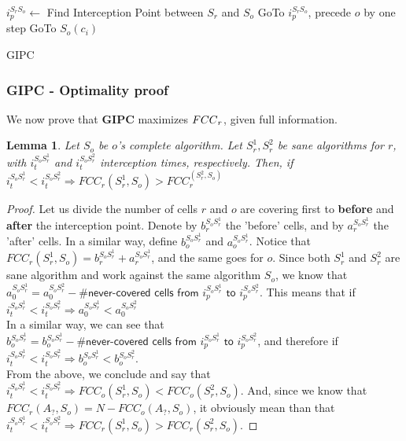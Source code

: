 \documentclass[a4paper,10pt]{article}
\newtheorem{lemma}[theorem]{Lemma}
\newcommand\rob{\ensuremath{r}\xspace}
\newcommand\opp{\ensuremath{o}\xspace}
\newcommand{\fcc}{\ensuremath{FCC}\xspace}
\begin{document}
\begin{algorithm}
\begin{algorithmic}
	\STATE $i_p^{S_{\rob} S_{\opp}} \leftarrow $ Find Interception Point between $S_{\rob}$ and $S_{\opp}$
    \STATE GoTo $i_p^{S_{\rob} S_{\opp}}$, precede \opp by one step
    \LOOP
        	\STATE GoTo $S_{\opp}(c_i)$
        \ENDIF
    \ENDLOOP
  
\end{algorithmic}
\caption{GIPC\label{lss}}
\end{algorithm}

\subsubsection{\textbf{GIPC} - Optimality proof}\label{subsection:GIPC, optimality proof}
We now prove that \textbf{GIPC} maximizes $\textnormal{\fcc}_{\rob}$, given full information. 
\begin{lemma}\label{lemmas:GIPC optimality lower i_t higher FCC}
Let $S_{\opp}$ be \opp's complete algorithm. Let $S_{\rob}^1,S_{\rob}^2$ be sane algorithms for \rob, with $i_t^{S_{\opp} S_{\rob}^1}$ and $i_t^{S_{\opp} S_{\rob}^2}$ interception times, respectively. Then, if $i_t^{S_{\opp} S_{\rob}^1} < i_t^{S_{\opp} S_{\rob}^2}\Rightarrow \fcc_{\rob}(S_{\rob}^1, S_{\opp}) > \fcc_{\rob}^(S_{\rob}^2, S_{\opp})$
\end{lemma}

\begin{proof}
Let us divide the number of cells \rob and \opp are covering first to \textbf{before} and \textbf{after} the interception point. Denote by $b_r^{S_{\opp} S_{\rob}^1}$ the 'before' cells, and by $a_r^{S_{\opp} S_{\rob}^1}$ the 'after' cells. In a similar way, define $b_{\opp}^{S_{\opp} S_{\rob}^1}$ and $a_{\opp}^{S_{\opp} S_{\rob}^1}$. Notice that $\fcc_{\rob}(S_{\rob}^1, S_{\opp})=b_r^{S_{\opp} S_{\rob}^1}+a_r^{S_{\opp} S_{\rob}^1}$, and the same goes for \opp. 
Since both $S_{\rob}^1$ and $S_{\rob}^2$ are sane algorithm and work against the same algorithm $S_{\opp}$, we know that $a_0^{S_{\opp} S_{\rob}^1}=a_0^{S_{\opp} S_{\rob}^2}-\textsf{\# never-covered cells from $i_p^{S_{\opp} S_{\rob}^1}$ to $i_p^{S_{\opp} S_{\rob}^2}$}$. This means that if $i_t^{S_{\opp} S_{\rob}^1}<i_t^{S_{\opp} S_{\rob}^2}\Rightarrow a_0^{S_{\opp} S_{\rob}^1}<a_0^{S_{\opp} S_{\rob}^2}$
\\In a similar way, we can see that $b_{\opp}^{S_{\opp} S_{\rob}^1}=b_{\opp}^{S_{\opp} S_{\rob}^1}-\textsf{\# never-covered cells from $i_p^{S_{\opp} S_{\rob}^1}$ to $i_p^{S_{\opp} S_{\rob}^2}$}$, and therefore if $i_t^{S_{\opp} S_{\rob}^1}<i_t^{S_{\opp} S_{\rob}^2}\Rightarrow b_{\opp}^{S_{\opp} S_{\rob}^1}<b_{\opp}^{S_{\opp} S_{\rob}^2}$.
\\From the above, we conclude and say that $i_t^{S_{\opp} S_{\rob}^1}<i_t^{S_{\opp} S_{\rob}^2}\Rightarrow \fcc_{\opp}(S_{\rob}^1, S_{\opp})<\fcc_{\opp}(S_{\rob}^2, S_{\opp})$. And, since we know that $\fcc_{\rob}(A_?, S_{\opp})=N-\fcc_{\opp}(A_?, S_{\opp})$, it obviously mean than that $i_t^{S_{\opp} S_{\rob}^1}<i_t^{S_{\opp} S_{\rob}^2}\Rightarrow \fcc_{\rob}(S_{\rob}^1, S_{\opp})>\fcc_{\rob}(S_{\rob}^2, S_{\opp})$.
\end{proof}
\end{document}

